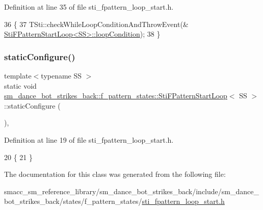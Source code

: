 Definition at line 35 of file sti\+\_\+fpattern\+\_\+loop\+\_\+start.\+h.


\begin{DoxyCode}
36   \{
37     TSti::checkWhileLoopConditionAndThrowEvent(&
      \hyperlink{structsm__dance__bot__strikes__back_1_1f__pattern__states_1_1StiFPatternStartLoop_a6afa94fcfe689fa8ab1e1f521d04a8b4}{StiFPatternStartLoop<SS>::loopCondition});
38   \}
\end{DoxyCode}
\mbox{\label{structsm__dance__bot__strikes__back_1_1f__pattern__states_1_1StiFPatternStartLoop_a60491b3ac76a720525efcd7df0a26de5}} 
\subsubsection{\texorpdfstring{static\+Configure()}{staticConfigure()}}
{\footnotesize\ttfamily template$<$typename SS $>$ \\
static void \hyperlink{structsm__dance__bot__strikes__back_1_1f__pattern__states_1_1StiFPatternStartLoop}{sm\+\_\+dance\+\_\+bot\+\_\+strikes\+\_\+back\+::f\+\_\+pattern\+\_\+states\+::\+Sti\+F\+Pattern\+Start\+Loop}$<$ SS $>$\+::static\+Configure (\begin{DoxyParamCaption}{ }\end{DoxyParamCaption})\hspace{0.3cm}{\ttfamily [inline]}, {\ttfamily [static]}}



Definition at line 19 of file sti\+\_\+fpattern\+\_\+loop\+\_\+start.\+h.


\begin{DoxyCode}
20   \{
21   \}
\end{DoxyCode}


The documentation for this class was generated from the following file\+:\begin{DoxyCompactItemize}
\item 
smacc\+\_\+sm\+\_\+reference\+\_\+library/sm\+\_\+dance\+\_\+bot\+\_\+strikes\+\_\+back/include/sm\+\_\+dance\+\_\+bot\+\_\+strikes\+\_\+back/states/f\+\_\+pattern\+\_\+states/\hyperlink{sm__dance__bot__strikes__back_2include_2sm__dance__bot__strikes__back_2states_2f__pattern__statebee9b97a3e2dff2a839f0e99817c78f1}{sti\+\_\+fpattern\+\_\+loop\+\_\+start.\+h}\end{DoxyCompactItemize}
